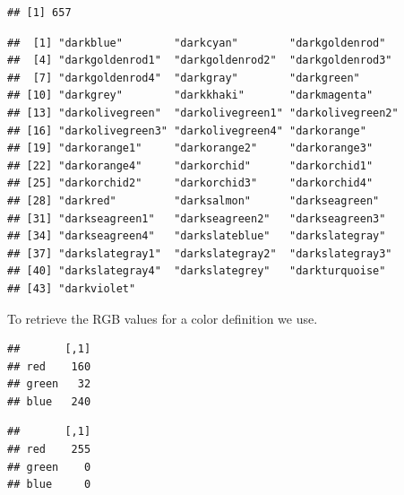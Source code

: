 \documentclass[krantz2]{krantz}\usepackage{knitr}%
\begin{document}
\begin{knitrout}\footnotesize
{}\color{fgcolor}\begin{kframe}
\begin{alltt}
\hlstd{(}\hlstd{())}
\end{alltt}
\begin{verbatim}
## [1] 657
\end{verbatim}
\begin{alltt}
\hlstd{(}\hlstd{,}\hlstd{(),}  \hlstd{=} \hlstd{)}
\end{alltt}
\begin{verbatim}
##  [1] "darkblue"        "darkcyan"        "darkgoldenrod"  
##  [4] "darkgoldenrod1"  "darkgoldenrod2"  "darkgoldenrod3" 
##  [7] "darkgoldenrod4"  "darkgray"        "darkgreen"      
## [10] "darkgrey"        "darkkhaki"       "darkmagenta"    
## [13] "darkolivegreen"  "darkolivegreen1" "darkolivegreen2"
## [16] "darkolivegreen3" "darkolivegreen4" "darkorange"     
## [19] "darkorange1"     "darkorange2"     "darkorange3"    
## [22] "darkorange4"     "darkorchid"      "darkorchid1"    
## [25] "darkorchid2"     "darkorchid3"     "darkorchid4"    
## [28] "darkred"         "darksalmon"      "darkseagreen"   
## [31] "darkseagreen1"   "darkseagreen2"   "darkseagreen3"  
## [34] "darkseagreen4"   "darkslateblue"   "darkslategray"  
## [37] "darkslategray1"  "darkslategray2"  "darkslategray3" 
## [40] "darkslategray4"  "darkslategrey"   "darkturquoise"  
## [43] "darkviolet"
\end{verbatim}
\end{kframe}
\end{knitrout}

To retrieve the RGB values for a color definition we use.

\begin{knitrout}\footnotesize
{}\color{fgcolor}\begin{kframe}
\begin{alltt}
\hlstd{(}\hlstd{)}
\end{alltt}
\begin{verbatim}
##       [,1]
## red    160
## green   32
## blue   240
\end{verbatim}
\begin{alltt}
\hlstd{(}\hlstd{)}
\end{alltt}
\begin{verbatim}
##       [,1]
## red    255
## green    0
## blue     0
\end{verbatim}
\end{kframe}
\end{knitrout}
\end{document}
